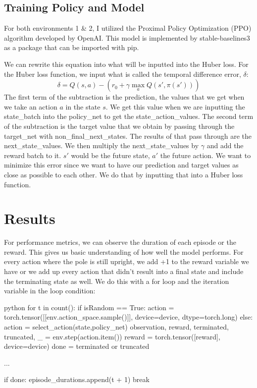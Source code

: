 \documentclass{article}
\numberwithin{equation}{section}
\numberwithin{equation}{section}
\begin{document}
\subsection*{Training Policy and Model}

For both environments 1 \& 2, I utilized the Proximal Policy Optimization (PPO) algorithm developed by OpenAI. This model is implemented by stable-baselines3 as a package that can be imported with pip. 





We can rewrite this equation into what will be inputted into the Huber loss.
For the Huber loss function, we input what is called the temporal difference error, $\delta$:
$$
\delta = Q(s,a) - \left(r_0 + \gamma \max_a Q(s',\pi(s'))\right)
$$
The first term of the subtraction is the prediction, the values that we get when we take an action $a$ in the state $s$. We get this value when we are inputting the state\_batch into the policy\_net to get the state\_action\_values. The second term of the subtraction is the target value that we obtain by passing through the target\_net with non\_final\_next\_states. The results of that pass through are the next\_state\_values. We then multiply the next\_state\_values by $\gamma$ and add the reward batch to it. $s'$ would be the future state, $a'$ the future action.  We want to minimize this error since we want to have our prediction and target values as close as possible to each other. We do that by inputting that into a Huber loss function. 










\section*{Results}
For performance metrics, we can observe the duration of each episode or the reward. This gives us basic understanding of how well the model performs. For every action where the pole is still upright, we add +1 to the reward variable we have or we add up every action that didn't result into a final state and include the terminating state as well. We do this with a for loop and the iteration variable in the loop condition:


\begin{mintedbox}{python}
for t in count():
	if isRandom  == True:
	  action = torch.tensor([[env.action_space.sample()]], device=device, dtype=torch.long)
	else:
	  action = select_action(state,policy_net)
	observation, reward, terminated, truncated, _ = env.step(action.item())
	reward = torch.tensor([reward], device=device)
	done = terminated or truncated

	...
	
	if done:
		episode_durations.append(t + 1)
		break
\end{mintedbox}
\end{document}

